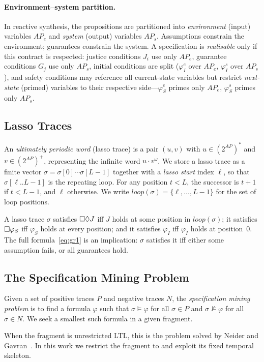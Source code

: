 \paragraph{Environment--system partition.}
In reactive synthesis, the propositions are partitioned into
\emph{environment} (input) variables $\mathit{AP}_e$ and
\emph{system} (output) variables $\mathit{AP}_s$.
Assumptions constrain the environment; guarantees constrain the
system.
A \GRone specification is \emph{realisable} only if this contract
is respected: justice conditions $J_i$ use only $\mathit{AP}_e$,
guarantee conditions $G_j$ use only $\mathit{AP}_s$,
initial conditions are split ($\varphi_I^e$ over $\mathit{AP}_e$,
$\varphi_I^s$ over $\mathit{AP}_s$), and safety conditions may
reference all current-state variables but restrict
\emph{next-state} (primed) variables to their respective
side---$\varphi_S^e$ primes only $\mathit{AP}_e$,
$\varphi_S^s$ primes only $\mathit{AP}_s$.

\subsection{Lasso Traces}\label{sec:lasso}

An \emph{ultimately periodic word} (lasso trace) is a pair $(u, v)$ with $u \in (2^{\mathit{AP}})^*$ and $v \in (2^{\mathit{AP}})^+$, representing the infinite word $u \cdot v^\omega$.
We store a lasso trace as a finite vector $\sigma = \sigma[0] \cdots \sigma[L{-}1]$ together with a \emph{lasso start} index $\ell$, so that $\sigma[\ell..L{-}1]$ is the repeating loop.
For any position $t < L$, the successor is $t{+}1$ if $t < L{-}1$, and $\ell$ otherwise.
We write $\mathit{loop}(\sigma) = \{\ell, \ldots, L{-}1\}$ for the set of loop positions.

A lasso trace $\sigma$ satisfies $\square\Diamond J$ iff $J$
holds at some position in $\mathit{loop}(\sigma)$; it satisfies
$\square \varphi_S$ iff $\varphi_S$ holds at every position; and it
satisfies $\varphi_I$ iff $\varphi_I$ holds at position~0.
The full formula~\eqref{eq:gr1} is an implication: $\sigma$ satisfies
it iff either some assumption fails, or all guarantees hold.

\subsection{The Specification Mining Problem}

\begin{definition}\label{def:mining}
Given a set of positive traces $P$ and negative traces $N$,
the \emph{specification mining problem} is to find a formula $\varphi$
such that $\sigma \models \varphi$ for all $\sigma \in P$ and
$\sigma \not\models \varphi$ for all $\sigma \in N$.
We seek a smallest such formula in a given fragment.
\end{definition}

When the fragment is unrestricted LTL, this is the problem solved by Neider and Gavran~\cite{NeiderG18}.
In this work we restrict the fragment to \GRone and exploit its fixed temporal skeleton.
